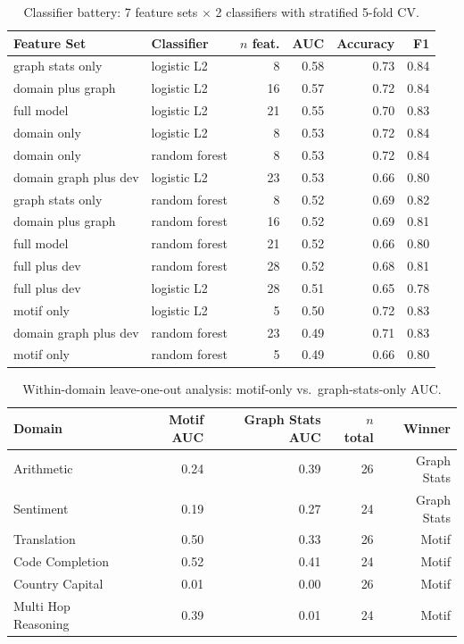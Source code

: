 \documentclass[11pt,a4paper]{article}
\begin{document}
\begin{table}[htbp]
\centering
\footnotesize
\caption{Classifier battery: 7 feature sets $\times$ 2 classifiers with stratified 5-fold CV.}
\label{tab:classifier}
\begin{tabular}{llrrrr}
\toprule
Feature Set & Classifier & $n$ feat. & AUC & Accuracy & F1 \\
\midrule
\rowcolor{rowgray}
graph stats only & logistic L2 & 8 & 0.58 & 0.73 & 0.84 \\
domain plus graph & logistic L2 & 16 & 0.57 & 0.72 & 0.84 \\
\rowcolor{rowgray}
full model & logistic L2 & 21 & 0.55 & 0.70 & 0.83 \\
domain only & logistic L2 & 8 & 0.53 & 0.72 & 0.84 \\
\rowcolor{rowgray}
domain only & random forest & 8 & 0.53 & 0.72 & 0.84 \\
domain graph plus dev & logistic L2 & 23 & 0.53 & 0.66 & 0.80 \\
\rowcolor{rowgray}
graph stats only & random forest & 8 & 0.52 & 0.69 & 0.82 \\
domain plus graph & random forest & 16 & 0.52 & 0.69 & 0.81 \\
\rowcolor{rowgray}
full model & random forest & 21 & 0.52 & 0.66 & 0.80 \\
full plus dev & random forest & 28 & 0.52 & 0.68 & 0.81 \\
\rowcolor{rowgray}
full plus dev & logistic L2 & 28 & 0.51 & 0.65 & 0.78 \\
motif only & logistic L2 & 5 & 0.50 & 0.72 & 0.83 \\
\rowcolor{rowgray}
domain graph plus dev & random forest & 23 & 0.49 & 0.71 & 0.83 \\
motif only & random forest & 5 & 0.49 & 0.66 & 0.80 \\
\bottomrule
\end{tabular}
\end{table}

\begin{table}[htbp]
\centering
\caption{Within-domain leave-one-out analysis: motif-only vs.\ graph-stats-only AUC.}
\label{tab:within-domain}
\begin{tabular}{lrrrr}
\toprule
Domain & Motif AUC & Graph Stats AUC & $n$ total & Winner \\
\midrule
Arithmetic & 0.24 & 0.39 & 26 & Graph Stats \\
Sentiment & 0.19 & 0.27 & 24 & Graph Stats \\
Translation & 0.50 & 0.33 & 26 & Motif \\
Code Completion & 0.52 & 0.41 & 24 & Motif \\
Country Capital & 0.01 & 0.00 & 26 & Motif \\
Multi Hop Reasoning & 0.39 & 0.01 & 24 & Motif \\
\bottomrule
\end{tabular}
\end{table}
\end{document}
